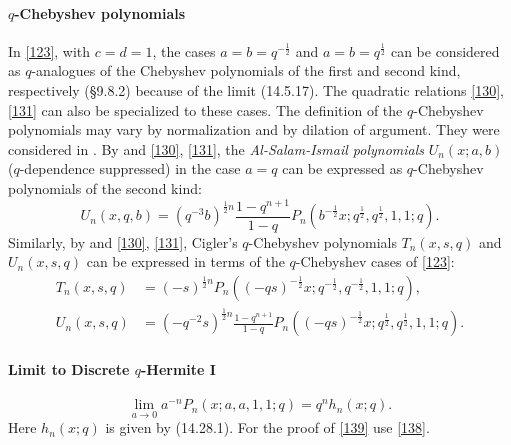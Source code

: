 \documentclass[twoside,11pt]{article}
\newcommand\half{\frac12}
\begin{document}
\paragraph{$q$-Chebyshev polynomials}
In \eqref{123}, with $c=d=1$, the cases $a=b=q^{-\half}$ and $a=b=q^\half$ can be considered
as $q$-analogues of the Chebyshev polynomials of the first and second kind, respectively
(\S9.8.2) because of the limit (14.5.17). The quadratic relations \eqref{130}, \eqref{131}
can also be specialized to these cases. The definition of the $q$-Chebyshev polynomials
may vary by normalization and by dilation of argument. They were considered in
\cite{K18}. 
By  and \eqref{130}, \eqref{131}, the {\em Al-Salam-Ismail polynomials}
$U_n(x;a,b)$ ($q$-dependence suppressed) in the case $a=q$ can be expressed as
$q$-Chebyshev polynomials of the second kind:
\begin{equation*}
U_n(x,q,b)=(q^{-3} b)^{\half n} \frac{1-q^{n+1}}{1-q} 
P_n(b^{-\half}x;q^\half,q^\half,1,1;q).
\end{equation*}
Similarly, by \cite[(5.4), (5.1), (5.3)]{K19} and \eqref{130}, \eqref{131}, Cigler's $q$-Chebyshev
polynomials $T_n(x,s,q)$ and $U_n(x,s,q)$
can be expressed in terms of the $q$-Chebyshev cases of \eqref{123}:
\begin{align*}
T_n(x,s,q)&=(-s)^{\half n} P_n((-qs)^{-\half} x;q^{-\half},q^{-\half},1,1;q),\\
U_n(x,s,q)&=(-q^{-2}s)^{\half n} \frac{1-q^{n+1}}{1-q} 
P_n((-qs)^{-\half} x;q^{\half},q^{\half},1,1;q).
\end{align*}
%
\paragraph{Limit to Discrete $q$-Hermite I}
\begin{equation}
\lim_{a\to0} a^{-n} P_n(x;a,a,1,1;q)=q^n h_n(x;q).
\label{139}
\end{equation}
Here $h_n(x;q)$ is given by (14.28.1).
For the proof of \eqref{139} use \eqref{138}.
%
\end{document}
